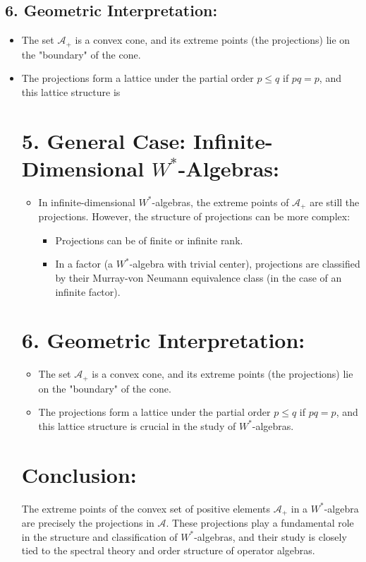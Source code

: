 \documentclass{article}
\begin{document}
\subsection*{6. Geometric Interpretation:}
\begin{itemize}
    \item The set \( \mathcal{A}_+ \) is a convex cone, and its extreme points (the projections) lie on the "boundary" of the cone.
    \item The projections form a lattice under the partial order \( p \leq q \) if \( pq = p \), and this lattice structure is\section*{5. General Case: Infinite-Dimensional \( W^* \)-Algebras:}
\begin{itemize}
    \item In infinite-dimensional \( W^* \)-algebras, the extreme points of \( \mathcal{A}_+ \) are still the projections. However, the structure of projections can be more complex:
    \begin{itemize}
        \item Projections can be of finite or infinite rank.
        \item In a factor (a \( W^* \)-algebra with trivial center), projections are classified by their Murray-von Neumann equivalence class (in the case of an infinite factor).
    \end{itemize}
\end{itemize}

\section*{6. Geometric Interpretation:}
\begin{itemize}
    \item The set \( \mathcal{A}_+ \) is a convex cone, and its extreme points (the projections) lie on the "boundary" of the cone.
    \item The projections form a lattice under the partial order \( p \leq q \) if \( pq = p \), and this lattice structure is crucial in the study of \( W^* \)-algebras.
\end{itemize}

\section*{Conclusion:}
The extreme points of the convex set of positive elements \( \mathcal{A}_+ \) in a \( W^* \)-algebra are precisely the projections in \( \mathcal{A} \). These projections play a fundamental role in the structure and classification of \( W^* \)-algebras, and their study is closely tied to the spectral theory and order structure of operator algebras.


\end{itemize}
\end{document}
